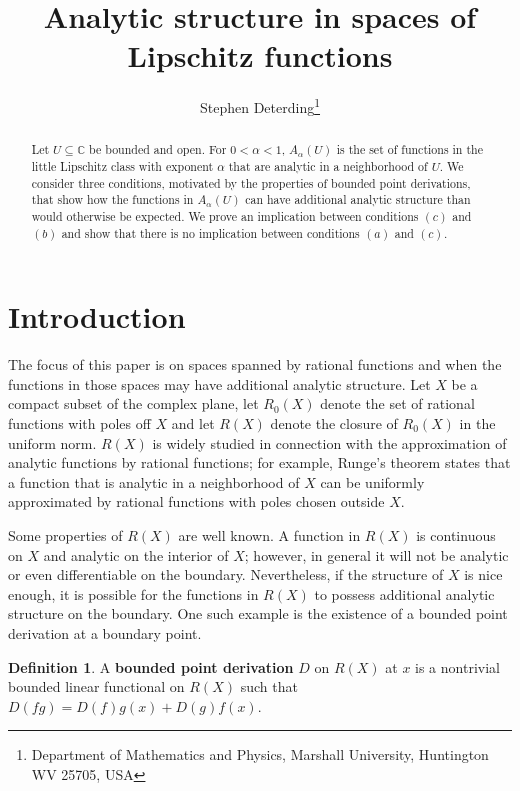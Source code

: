 \documentclass{article}
\title{Analytic structure in spaces of Lipschitz functions}
\author{Stephen Deterding\thanks{Department of Mathematics and Physics, Marshall University, Huntington WV 25705, USA}}
\date{}
\theoremstyle{definition}
\newtheorem{definition}{Definition}
\begin{document}
\maketitle

\begin{abstract}
    Let $U \subseteq \mathbb C$ be bounded and open. For $0 < \alpha < 1$, $A_\alpha(U)$ is the set of functions in the little Lipschitz class with exponent $\alpha$ that are analytic in a neighborhood of $U$. We consider three conditions, motivated by the properties of bounded point derivations, that show how the functions in $A_\alpha(U)$ can have additional analytic structure than would otherwise be expected. We prove an implication between conditions $(c)$ and $(b)$ and show that there is no implication between conditions $(a)$ and $(c)$.
\end{abstract}

\section{Introduction}

The focus of this paper is on spaces spanned by rational functions and when the functions in those spaces may have additional analytic structure. Let $X$ be a compact subset of the complex plane, let $R_0(X)$ denote the set of rational functions with poles off $X$ and let $R(X)$ denote the closure of $R_0(X)$ in the uniform norm. $R(X)$ is widely studied in connection with the approximation of analytic functions by rational functions; for example, Runge's theorem states that a function that is analytic in a neighborhood of $X$ can be uniformly approximated by rational functions with poles chosen outside $X$.

Some properties of $R(X)$ are well known. A function in $R(X)$ is continuous on $X$ and analytic on the interior of $X$; however, in general it will not be analytic or even differentiable on the boundary. Nevertheless, if the structure of $X$ is nice enough, it is possible for the functions in $R(X)$ to possess additional analytic structure on the boundary. One such example is the existence of a bounded point derivation at a boundary point. 

\begin{definition}
A \textbf{bounded point derivation} $D$ on $R(X)$ at $x$ is a nontrivial bounded linear functional on $R(X)$ such that $D(fg) = D(f) g(x) + D(g) f(x)$.
\end{definition}
\end{document}
